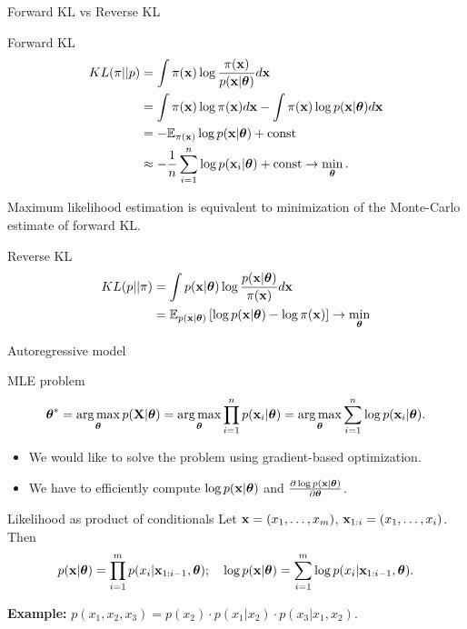 \begin{frame}{Forward KL vs Reverse KL}
	\begin{block}{Forward KL}
		\vspace{-0.5cm}
		\begin{align*}
			KL(\pi || p) &= \int \pi (\mathbf{x}) \log \frac{\pi(\mathbf{x})}{p(\mathbf{x} | \boldsymbol{\theta})} d \mathbf{x} \\
			&= \int \pi (\mathbf{x}) \log \pi(\mathbf{x}) d \mathbf{x} - \int \pi (\mathbf{x}) \log p(\mathbf{x} | \boldsymbol{\theta}) d \mathbf{x} \\
			&= - \mathbb{E}_{\pi(\mathbf{x})} \log p(\mathbf{x} | \boldsymbol{\theta}) + \text{const} \\
			& \approx - \frac{1}{n} \sum_{i=1}^n \log p(\mathbf{x}_i | \boldsymbol{\theta}) + \text{const} \rightarrow \min_{\boldsymbol{\theta}}.
		\end{align*}
		\vspace{-0.5cm}
	\end{block}
	Maximum likelihood estimation is equivalent to minimization of the Monte-Carlo estimate of forward KL.
	\begin{block}{Reverse KL}
		\vspace{-0.5cm}
		\begin{align*}
			KL(p || \pi) &= \int p(\mathbf{x} | \boldsymbol{\theta}) \log \frac{p(\mathbf{x} | \boldsymbol{\theta})}{\pi(\mathbf{x})} d \mathbf{x} \\
			&= \mathbb{E}_{p(\mathbf{x} | \boldsymbol{\theta})} \left[\log p(\mathbf{x} | \boldsymbol{\theta}) - \log \pi(\mathbf{x})\right] \rightarrow \min_{\boldsymbol{\theta}}
		\end{align*}
		\vspace{-0.7cm}
	\end{block}
\end{frame}
\begin{frame}{Autoregressive model}
    \begin{block}{MLE problem}
	    \vspace{-0.7cm}
	    \[
	        \boldsymbol{\theta}^* = \operatorname*{arg\,max}_{\boldsymbol{\theta}} p(\mathbf{X} | \boldsymbol{\theta}) = \operatorname*{arg\,max}_{\boldsymbol{\theta}} \prod_{i=1}^n p(\mathbf{x}_i | \boldsymbol{\theta}) = \operatorname*{arg\,max}_{\boldsymbol{\theta}} \sum_{i=1}^n \log p(\mathbf{x}_i | \boldsymbol{\theta}).
	    \]
	    \vspace{-0.5cm}
    \end{block}
    \begin{itemize}
        \item We would like to solve the problem using gradient-based optimization.
        \item We have to efficiently compute $\log p(\mathbf{x} | \boldsymbol{\theta})$ and $\frac{\partial \log p(\mathbf{x} | \boldsymbol{\theta})}{\partial \boldsymbol{\theta}}$.
    \end{itemize}
    \begin{block}{Likelihood as product of conditionals}
    Let $\mathbf{x} = (x_1, \dots, x_m)$, $\mathbf{x}_{1:i} = (x_1, \dots, x_i)$. Then 
    \[
        p(\mathbf{x} | \boldsymbol{\theta}) = \prod_{i=1}^m p(x_i | \mathbf{x}_{1:i - 1}, \boldsymbol{\theta}); \quad 
        \log p(\mathbf{x} | \boldsymbol{\theta}) = \sum_{i=1}^m \log p(x_i | \mathbf{x}_{1:i - 1}, \boldsymbol{\theta}).
    \]
    \end{block}
	\textbf{Example:} $p(x_1, x_2, x_3) = p(x_2) \cdot p(x_1 | x_2) \cdot p(x_3 | x_1, x_2)$.
\end{frame}
